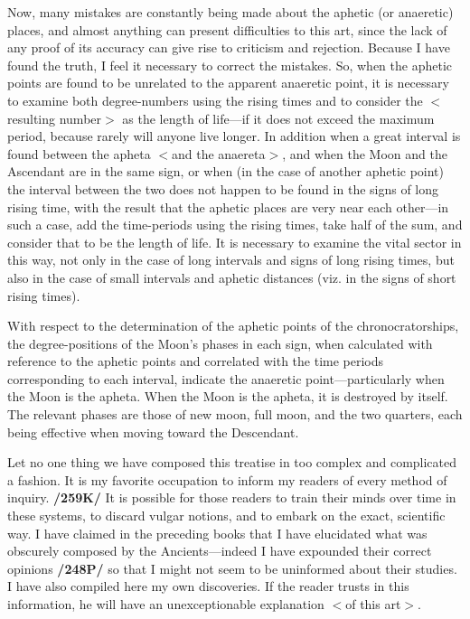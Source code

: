 Now, many mistakes are constantly being made about the aphetic (or anaeretic) places, and almost anything can present difficulties to this art, since the lack of any proof of its accuracy can give rise to criticism and rejection. Because I have found the truth, I feel it necessary to correct the mistakes. So, when the aphetic points are found to be unrelated to the apparent anaeretic point, it is necessary to examine
both degree-numbers using the rising times and to consider the $<$resulting number$>$ as the length of life—if it does not exceed the maximum period, because rarely will anyone live longer. In addition when a great interval is found between the apheta $<$and the anaereta$>$, and when the Moon and the Ascendant are in the
same sign, or when (in the case of another aphetic point) the interval between the two does not happen to be found in the signs of long rising time, with the result that the aphetic places are very near each other—in such a case, add the time-periods using the rising times, take half of the sum, and consider that to be the length of life. It is necessary to examine the vital sector in this way, not only in the case of long intervals and signs of long rising times, but also in the case of small intervals and aphetic distances (viz. in the signs of short rising times).

With respect to the determination of the aphetic points of the chronocratorships, the degree-positions of the Moon’s phases in each sign, when calculated with reference to the aphetic points and correlated with the time periods corresponding to each interval, indicate the anaeretic point—particularly when the Moon is the apheta. When the Moon is the apheta, it is destroyed by itself. The relevant phases are those of new moon, full moon, and the two quarters, each being effective when moving toward the Descendant.

Let no one thing we have composed this treatise in too complex and complicated a fashion. It is my favorite occupation to inform my readers of every method of inquiry. \textbf{/259K/} It is possible for those readers to train their minds over time in these systems, to discard vulgar notions, and to embark on the exact, scientific way. I have claimed in the preceding books that I have elucidated what was obscurely composed by the Ancients—indeed I have expounded their correct opinions \textbf{/248P/} so that I might not seem to be
uninformed about their studies. I have also compiled here my own discoveries. If the reader trusts in this information, he will have an unexceptionable explanation $<$of this art$>$. 

